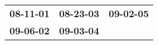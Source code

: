 \begin{supertabular}{p{0.33\columnwidth}p{0.33\columnwidth}p{0.33\columnwidth}}
 \textbf{08-11-01\textsuperscript{}} &  \textbf{08-23-03\textsuperscript{}} &  \textbf{09-02-05\textsuperscript{}} \\
 \textbf{09-06-02\textsuperscript{}} &  \textbf{09-03-04\textsuperscript{}} &                                      \\
\end{supertabular}
